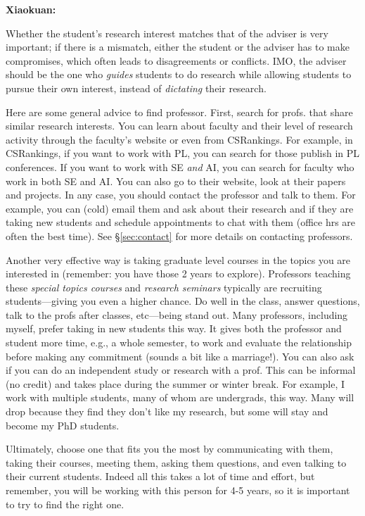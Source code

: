 \documentclass[11pt]{article}
\newenvironment{commentbox}[1][]{
\small
    \begin{mybox}
    {\small \textbf{#1}}
 }{
   \end{mybox}
}
\begin{document}
\begin{commentbox}[Xiaokuan:]
    Whether the student's research interest matches that of the adviser is very important;
    if there is a mismatch,
    either the student or the adviser has to make compromises,
    which often leads to disagreements or conflicts. 
    IMO, the adviser should be the one who {\it guides}  students to do research while allowing students to pursue their own interest,
    instead of {\it dictating} their research.
    \end{commentbox}

Here are some general advice to find professor.  First, search for profs. that share similar research interests. You can learn about faculty and their level of research activity through the faculty's website or even from CSRankings.  For example, in CSRankings, if you want to work with PL, you can search for those publish in PL conferences.  If you want to work with SE \emph{and} AI, you can search for faculty who work in both SE and AI.   You can also go to their website, look at their papers and projects.  In any case, you should contact the professor and talk to them. For example, you can (cold) email them and ask about their research and if they are taking new students and schedule appointments to chat with them (office hrs are often the best time).  See \S\ref{sec:contact} for more details on contacting professors.  

Another very effective way is taking graduate level courses in the topics you are interested in (remember: you have those 2 years to explore).  Professors teaching these \emph{special topics courses} and \emph{research seminars} typically are recruiting students---giving you even a higher chance. Do well in the class, answer questions, talk to the profs after classes, etc---being stand out.  Many professors, including myself, prefer taking in new students this way.  It gives both the professor and student more time, e.g., a whole semester, to work and evaluate the relationship before making any commitment (sounds a bit like a marriage!).  
You can also ask if you can do an independent study or research with a prof. This can be informal (no credit) and takes place during the summer or winter break.  For example, I work with multiple students, many of whom are undergrads, this way. Many will drop because they find they don't like my research, but some will stay and become my PhD students.

Ultimately, choose one that fits you the most by communicating with them, taking their courses, meeting them, asking them questions, and even talking to their current students. Indeed all this takes a lot of time and effort, but remember, you will be working with this person for 4-5 years, so it is important to try to find the right one. 
\end{document}
